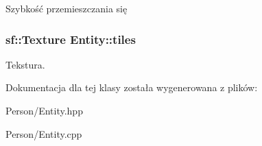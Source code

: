 Szybkość przemieszczania się 


\begin{DoxyItemize}
\item 
\end{DoxyItemize}\hypertarget{class_entity_a50a3dffcf26eb1950587414663951267}{
\subsubsection[{tiles}]{\setlength{\rightskip}{0pt plus 5cm}sf\-::\-Texture Entity\-::tiles\hspace{0.3cm}{\ttfamily [protected]}}}\label{class_entity_a50a3dffcf26eb1950587414663951267}


Tekstura. 


\begin{DoxyItemize}
\item 
\end{DoxyItemize}

Dokumentacja dla tej klasy została wygenerowana z plików\-:\begin{DoxyCompactItemize}
\item 
Person/Entity.\-hpp\item 
Person/Entity.\-cpp\end{DoxyCompactItemize}

